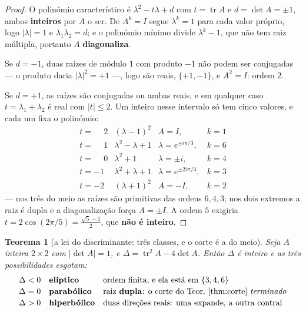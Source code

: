 \documentclass[11pt,a4paper]{article}
\newtheorem{teorema}{Teorema}
\begin{document}
\begin{proof}
O polinómio característico é $\lambda^{2}-t\lambda+d$ com $t=\operatorname{tr}A$
e $d=\det A=\pm1$, ambos \textbf{inteiros} por $A$ o ser. De $A^{k}=I$ segue
$\lambda^{k}=1$ para cada valor próprio, logo $\lvert\lambda\rvert=1$ e
$\lambda_{1}\lambda_{2}=d$; e o polinómio mínimo divide $\lambda^{k}-1$, que não
tem raiz múltipla, portanto $A$ \textbf{diagonaliza}.

Se $d=-1$, duas raízes de módulo $1$ com produto $-1$ não podem ser conjugadas
--- o produto daria $\lvert\lambda\rvert^{2}=+1$ ---, logo são reais, $\{+1,-1\}$,
e $A^{2}=I$: ordem $2$.

Se $d=+1$, as raízes são conjugadas ou ambas reais, e em qualquer caso
$t=\lambda_{1}+\lambda_{2}$ é real com $\lvert t\rvert\le2$. Um inteiro nesse
intervalo só tem cinco valores, e cada um fixa o polinómio:
\[
\begin{array}{cclr}
t=\phantom{-}2 & (\lambda-1)^{2} & A=I, & k=1\\
t=\phantom{-}1 & \lambda^{2}-\lambda+1 & \lambda=e^{\pm i\pi/3}, & k=6\\
t=\phantom{-}0 & \lambda^{2}+1 & \lambda=\pm i, & k=4\\
t=-1 & \lambda^{2}+\lambda+1 & \lambda=e^{\pm2i\pi/3}, & k=3\\
t=-2 & (\lambda+1)^{2} & A=-I, & k=2
\end{array}
\]
--- nos três do meio as raízes são primitivas das ordens $6,4,3$; nos dois
extremos a raiz é dupla e a diagonalização força $A=\pm I$. A ordem $5$ exigiria
$t=2\cos(2\pi/5)=\tfrac{\sqrt5-1}{2}$, que \textbf{não é inteiro}.
\end{proof}

\begin{teorema}[a lei do discriminante: três classes, e o corte é a do meio]\label{thm:leidisc}
Seja $A$ inteira $2\times2$ com $\lvert\det A\rvert=1$, e
$\Delta=\operatorname{tr}^{2}A-4\det A$. Então $\Delta$ é inteiro e as três
possibilidades esgotam:
\[
\begin{array}{lll}
\Delta<0 & \textbf{elíptico} & \text{ordem finita, e ela está em }\{3,4,6\}\\[2pt]
\Delta=0 & \textbf{parabólico} & \text{raiz \textbf{dupla}: o corte do Teor.~\ref{thm:corte} \emph{terminado}}\\[2pt]
\Delta>0 & \textbf{hiperbólico} & \text{duas direções reais: uma expande, a outra contrai}
\end{array}
\]
\end{teorema}
\end{document}

